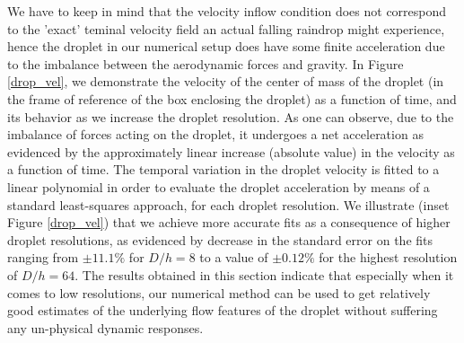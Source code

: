 We have to keep in mind that the velocity inflow condition does not correspond to the 'exact' teminal velocity field an actual falling raindrop might experience, hence the droplet in our numerical setup does have some finite acceleration due to the imbalance between the aerodynamic forces and gravity. In Figure \ref{drop_vel}, we demonstrate the velocity of the center of mass of the droplet (in the frame of reference of the box enclosing the droplet) as a function of time, and its behavior as we increase the droplet resolution. As one can observe, due to the imbalance of forces acting on the droplet, it undergoes a net acceleration as evidenced by the approximately linear increase (absolute value) in the velocity as a function of time. The temporal variation in the droplet velocity is fitted to a linear polynomial in order to evaluate the droplet acceleration by means of a standard least-squares approach, for each droplet resolution. We illustrate (inset Figure \ref{drop_vel}) that we achieve more accurate fits as a consequence of higher droplet resolutions, as evidenced by decrease in the standard error on the fits ranging from $\pm 11.1 \%$ for $D/h = 8$ to a value of $\pm 0.12 \%$ for the highest resolution of $D/h = 64$. The results obtained in this section indicate that especially when it comes to low resolutions, our numerical method can be used to get relatively good estimates of the underlying flow features of the droplet without suffering any un-physical dynamic responses.           


%

